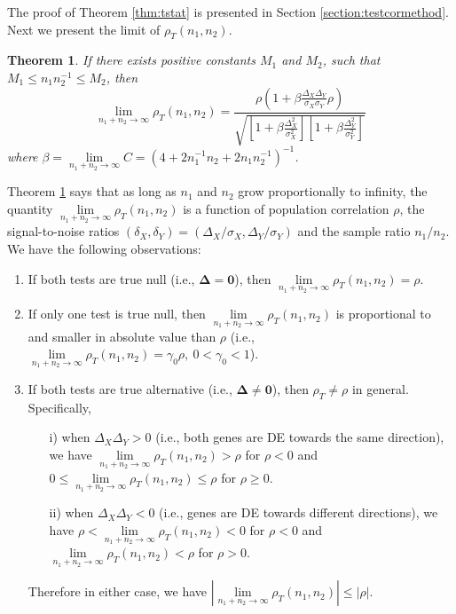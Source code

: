 \documentclass[12pt, a4paper]{article}
\newtheorem{theorem}{Theorem}       %
\begin{document}
The proof of Theorem \ref{thm:tstat} is presented in Section \ref{section:testcormethod}. Next 
we present the limit of $\rho_T(n_1,n_2)$.
\begin{theorem}\label{thm:rholimit}
	If there exists positive constants $M_1$ and $M_2$, such that $M_1 \leq n_1n_2^{-1}\leq 
	M_2$, then
	\begin{equation}\label{eq:limitT}
	\lim\limits_{n_1 + n_2 \rightarrow \infty} \rho_T(n_1, n_2) = \frac{\rho(1  +
		\beta\frac{\Delta_X\Delta_Y}{\sigma_X\sigma_Y}\rho)}{\sqrt{  \left[ 1 
			+\beta\frac{\Delta_X^2}{\sigma_X^2}\right]\left[ 1 + 
			\beta\frac{\Delta_Y^2}{\sigma_Y^2}\right]}}
	\end{equation}
	where %
	$\beta = \lim\limits_{n_1 + n_2 \rightarrow \infty}C = (4 + 2n_1^{-1}n_2 + 
	2n_1n_2^{-1})^{-1}$.
\end{theorem}
Theorem \ref{thm:rholimit} says that as long as $n_1$ and $n_2$ grow proportionally to 
infinity, the quantity $\lim\limits_{n_1 + n_2 \rightarrow \infty} \rho_T(n_1, n_2)$ is a function 
of population correlation $\rho$, the 
signal-to-noise ratios $(\delta_X, \delta_Y) = (\Delta_X/\sigma_X, \Delta_Y/\sigma_Y)$  and the 
sample ratio $n_1/n_2$. 
We have the following observations:
\begin{enumerate}
	\item If both tests are true null (i.e., $\bm \Delta = \bm 0$), then $\lim\limits_{n_1 + n_2 
		\rightarrow \infty} \rho_T(n_1, n_2) = \rho$.
	\item If only one test is true null, then $\lim\limits_{n_1 + n_2 \rightarrow \infty} 
	\rho_T(n_1, n_2)$ is proportional to and smaller in 
	absolute value than $\rho$ (i.e., $\lim\limits_{n_1 + n_2 \rightarrow \infty} \rho_T(n_1, n_2) 
	= \gamma_0\rho,~ 0 <\gamma_0 <1$).
	\item If both tests are true alternative (i.e., $\bm \Delta \neq \bm 0$), then $\rho_T\neq 
	\rho$ in general. Specifically,
	\begin{enumerate}
		\item[i)]  when $\Delta_X\Delta_Y >0$ (i.e., both genes are DE towards the same 
		direction), we have $\lim\limits_{n_1 + n_2 \rightarrow \infty} \rho_T(n_1, n_2)>\rho$ for 
		$\rho <0$ and $0 \leq \lim\limits_{n_1 + n_2 \rightarrow \infty} \rho_T(n_1, n_2) \leq\rho$ 
		for $\rho 
		\geq 0$.
		\item[ii)] when $\Delta_X\Delta_Y <0$ (i.e., genes are DE towards different 
		directions), we have
		$\rho <\lim\limits_{n_1 + n_2 \rightarrow \infty} \rho_T(n_1, n_2)<0$ for $\rho <0$ and 
		$\lim\limits_{n_1 + n_2 \rightarrow \infty} \rho_T(n_1, n_2)<\rho$ for $\rho>0$.
	\end{enumerate}
	Therefore in either case, we have $|\lim\limits_{n_1 + n_2 \rightarrow \infty} \rho_T(n_1, 
	n_2)| \leq |\rho|$. 
\end{enumerate}
\end{document}
